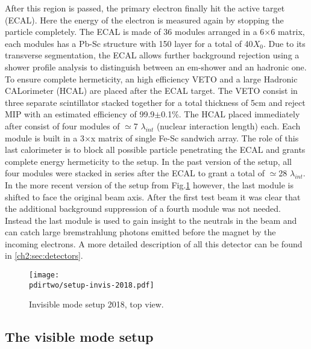 After this region is passed, the primary electron finally hit the active target (ECAL). Here the energy of the electron is measured again by stopping the particle completely. The ECAL is made of 36 modules arranged in a 6$\times$6 matrix, each modules has a Pb-Sc structure with 150 layer for a total of 40$X_0$. Due to its transverse segmentation, the ECAL allows further background rejection using a shower profile analysis to distinguish between an em-shower and an hadronic one. To ensure complete hermeticity, an high efficiency VETO and a large Hadronic CALorimeter (HCAL) are placed after the ECAL target. The VETO consist in three separate scintillator stacked together for a total thickness of 5\si{cm} and reject MIP with an estimated efficiency of 99.9$\pm$0.1\%. The HCAL placed immediately after consist of four modules of $\simeq$7 $\lambda_{int}$ (nuclear interaction length) each. Each module is built in a 3$\times$x matrix of single Fe-Sc sandwich array. The role of this last calorimeter is to block all possible particle penetrating the ECAL and grants complete energy hermeticity to the setup. In the past version of the setup, all four modules were stacked in series after the ECAL to grant a total of $\simeq$28 $\lambda_{int}$. In the more recent version of the setup from Fig.\ref{fig:setup-invis-2018} however, the last module is shifted to face the original beam axis. After the first test beam it was clear that the additional background suppression of a fourth module was not needed. Instead the last module is used to gain insight to the neutrals in the beam and can catch large bremstrahlung photons emitted before the magnet by the incoming electrons. A more detailed description of all this detector can be found in \ref{ch2:sec:detectors}.


\begin{figure}[tbh!]
  \centering
  \texttt{[image: \\pdirtwo/setup-invis-2018.pdf]}
  \caption[invisible mode setup 2018]{Invisible mode setup 2018, top view.}
  \label{fig:setup-invis-2018}
\end{figure}

\subsection{The visible mode setup}
\label{ch2:sec:vismode}

